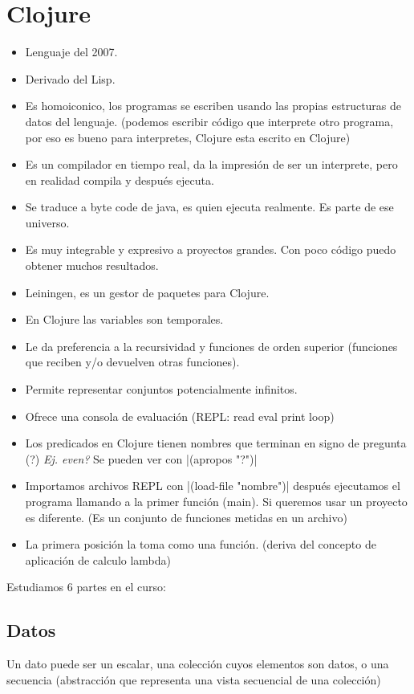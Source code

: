 \section{Clojure}
\begin{itemize}
\item Lenguaje del 2007.
\item Derivado del Lisp.
\item Es homoiconico, los programas se escriben usando las propias estructuras de datos del lenguaje. (podemos escribir código que interprete otro programa, por eso es bueno para interpretes, Clojure esta escrito en Clojure)
\item Es un compilador en tiempo real, da la impresión de ser un interprete, pero en realidad compila y después ejecuta.
\item Se traduce a byte code de java, es quien ejecuta realmente. Es parte de ese universo.
\item Es muy integrable y expresivo a proyectos grandes. Con poco código puedo obtener muchos resultados.
\item Leiningen, es un gestor de paquetes para Clojure.
\item En Clojure las variables son temporales.
\item Le da preferencia a la recursividad y funciones de orden superior (funciones que reciben y/o devuelven otras funciones).
\item Permite representar conjuntos potencialmente infinitos.
\item Ofrece una consola de evaluación (REPL: read eval print loop)
\item Los predicados en Clojure tienen nombres que terminan en signo de pregunta (?) \textit{Ej. even?} Se pueden ver con |(apropos "?")|
\item Importamos archivos REPL con |(load-file "nombre")| después ejecutamos el programa llamando a la primer función (main). Si queremos usar un proyecto es diferente. (Es un conjunto de funciones metidas en un archivo)
\item La primera posición la toma como una función. (deriva del concepto de aplicación de calculo lambda)
\end{itemize}


Estudiamos 6 partes en el curso:
\subsection*{Datos}
Un dato puede ser un escalar, una colección cuyos elementos son datos, o una secuencia (abstracción que representa una vista secuencial de una colección)

